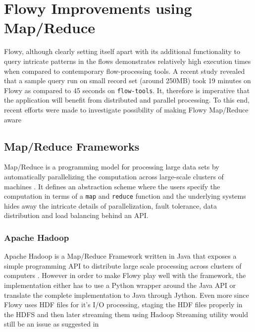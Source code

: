 \chapter{Flowy Improvements using Map/Reduce}\label{ch:flowy-mapreduce}

Flowy, although clearly setting itself apart with its additional functionality
to query intricate patterns in the flows demonstrates relatively high
execution times when compared to contemporary flow-processing tools. A recent
study \cite{pnemeth:thesis:2010} revealed that a sample query run on small
record set (around 250MB) took 19 minutes on Flowy as compared to 45 seconds
on \texttt{flow-tools}. It, therefore is imperative that the application will
benefit from distributed and parallel processing. To this end, recent efforts
were made to investigate possibility of making Flowy Map/Reduce aware
\cite{pnemeth:thesis:2010}

\section{Map/Reduce Frameworks}\label{sec:map-reduce}

Map/Reduce is a programming model for processing large data sets by automatically parallelizing the computation across large-scale clusters of machines \cite{jdean:2004}. It defines an abstraction scheme where the users specify the computation in terms of a \texttt{map} and \texttt{reduce} function and the underlying systems hides away the intricate details of parallelization, fault tolerance, data distribution and load balancing behind an \ac{API}.

\subsection{Apache Hadoop}\label{subsec:hadoop}
Apache Hadoop is a Map/Reduce Framework written in Java that exposes a simple programming API to distribute large scale processing across clusters of computers \cite{twhite:hadoop:2010}. However in order to make Flowy play well with the framework, the implementation either has to use a Python wrapper around the Java \ac{API} or translate the complete implementation to Java through Jython. Even more since Flowy uses \ac{HDF} files for it's I/O processing, staging the \ac{HDF} files properly in the \ac{HDFS} \cite{kshvachko:2010} and then later streaming them using Hadoop Streaming utility would still be an issue as suggested in \cite{pnemeth:thesis:2010}
	
